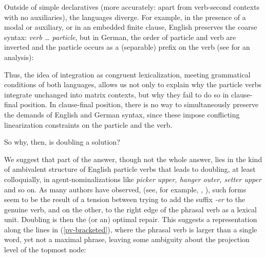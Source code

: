 \documentclass[output=paper]{langscibook}
\begin{document}
Outside of simple declaratives (more accurately: apart from verb-second contexts with no auxiliaries), the languages diverge. For example, in the presence of a modal or auxiliary, or in an embedded finite clause, English preserves the coarse syntax: \textit{verb {\ldots} particle}, but in German, the order of particle and verb are inverted and the particle occurs as a (separable) prefix on the verb (see \citealp{wurmbrand98} for an analysis):

\ea
{}
\z\z 

Thus, the idea of integration as congruent lexicalization, meeting grammatical conditions of both languages, allows us not only to explain why the particle verbs integrate unchanged into matrix contexts, but why they fail to do so in clause-final position. In clause-final position, there is no way to simultaneously preserve the demands of English and German syntax, since these impose conflicting linearization constraints on the particle and the verb. 

So why, then, is doubling a solution? 

We suggest that part of the answer, though not the whole answer, lies in the kind of ambivalent structure of English particle verbs that leads to doubling, at least colloquially, in agent-nominalizations like \textit{picker upper, hanger outer, setter upper} and so on. As many authors have observed, (see, for example, \citealp{sproat85}, \citealp[160]{ackneel04}), such forms seem to be the result of a tension between trying to add the suffix \textit{-er} to the genuine verb, and on the other, to the right edge of the phrasal verb as a lexical unit. Doubling is then the (or an) optimal repair. This suggests a representation along the lines in (\ref{pv-bracketed}), where the phrasal verb is larger than a single word, yet not a maximal phrase, leaving some ambiguity about the projection level of the topmost node: 
\end{document}
